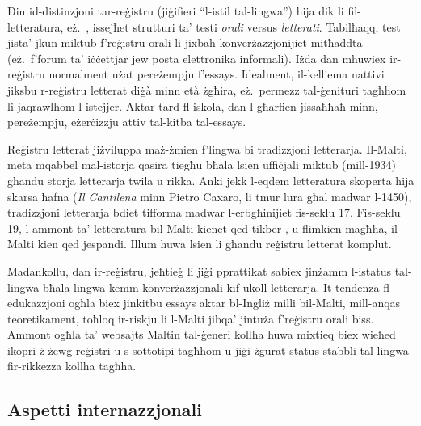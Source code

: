 \begin{multicols}{2}
Din id-distinzjoni tar-reġistru (jiġifieri ``l-istil tal-lingwa'') hija dik li fil-letteratura, eż.~\cite{Biber:1991}, issejħet strutturi ta’ testi \emph{orali} versus \emph{letterati}. Tabilħaqq, test jista’ jkun miktub f'reġistru orali li jixbah konverżazzjonijiet mitħaddta (eż.~f’forum ta’ iċċettjar jew posta elettronika informali). Iżda dan mhuwiex ir-reġistru normalment użat pereżempju f'essays. Idealment, il-kelliema nattivi jiksbu r-reġistru letterat diġà minn età żgħira, eż.~permezz tal-ġenituri tagħhom li jaqrawlhom l-istejjer. Aktar tard fl-iskola, dan l-għarfien jissaħħaħ minn, pereżempju, eżerċizzju attiv tal-kitba tal-essays.
\columnbreak

Reġistru letterat jiżviluppa maż-żmien f’lingwa bi tradizzjoni letterarja. Il-Malti, meta mqabbel mal-istorja qasira tiegħu bħala lsien uffiċjali miktub (mill-1934) għandu storja letterarja twila u rikka. Anki jekk l-eqdem letteratura skoperta hija skarsa ħafna (\emph{Il Cantilena} minn Pietro Caxaro, li tmur lura għal madwar l-1450), tradizzjoni letterarja bdiet tifforma madwar l-erbgħinijiet fis-seklu 17. Fis-seklu 19, l-ammont ta’ letteratura bil-Malti kienet qed tikber \cite{Fabri:2011a}, u flimkien magħha, il-Malti kien qed jespandi. Illum huwa lsien li għandu reġistru letterat komplut.

Madankollu, dan ir-reġistru, jeħtieġ li jiġi pprattikat sabiex jinżamm l-istatus tal-lingwa bħala lingwa kemm konverżazzjonali kif ukoll letterarja. It-tendenza fl-edukazzjoni ogħla biex jinkitbu essays aktar bl-Ingliż milli bil-Malti, mill-anqas teoretikament, toħloq ir-riskju li l-Malti jibqa’ jintuża f’reġistru orali biss. Ammont ogħla ta’ websajts Maltin tal-ġeneri kollha huwa mixtieq biex wieħed ikopri ż-żewġ reġistri u s-sottotipi tagħhom u jiġi żgurat status stabbli tal-lingwa fir-rikkezza kollha tagħha.

\subsection{Aspetti internazzjonali}


\end{multicols}
